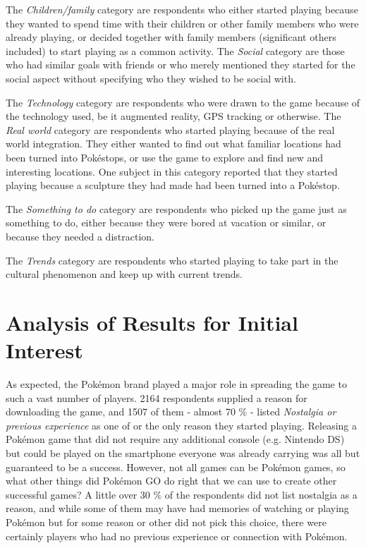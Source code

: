 The \emph{Children/family} category are respondents who either started playing because they wanted to spend time with their children or other family members who were already playing, or decided together with family members (significant others included) to start playing as a common activity. The \emph{Social} category are those who had similar goals with friends or who merely mentioned they started for the social aspect without specifying who they wished to be social with.

The \emph{Technology} category are respondents who were drawn to the game because of the technology used, be it augmented reality, GPS tracking or otherwise. The \emph{Real world} category are respondents who started playing because of the real world integration. They either wanted to find out what familiar locations had been turned into Pokéstops, or use the game to explore and find new and interesting locations. One subject in this category reported that they started playing because a sculpture they had made had been turned into a Pokéstop.

The \emph{Something to do} category are respondents who picked up the game just as something to do, either because they were bored at vacation or similar, or because they needed a distraction.

The \emph{Trends} category are respondents who started playing to take part in the cultural phenomenon and keep up with current trends.


\section{Analysis of Results for Initial Interest}
\label{sec:success-factors-initial-interest-analysis}

As expected, the Pokémon brand played a major role in spreading the game to such a vast number of players. 2164 respondents supplied a reason for downloading the game, and 1507 of them - almost 70 \% - listed \emph{Nostalgia or previous experience} as one of or the only reason they started playing. Releasing a Pokémon game that did not require any additional console (e.g. Nintendo DS) but could be played on the smartphone everyone was already carrying was all but guaranteed to be a success. However, not all games can be Pokémon games, so what other things did Pokémon GO do right that we can use to create other successful games? A little over 30 \% of the respondents did not list nostalgia as a reason, and while some of them may have had memories of watching or playing Pokémon but for some reason or other did not pick this choice, there were certainly players who had no previous experience or connection with Pokémon.


